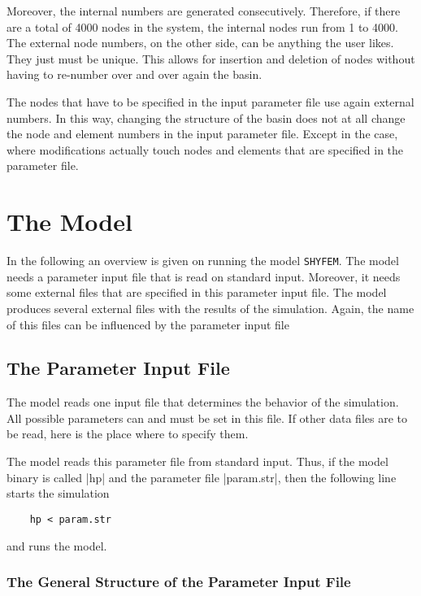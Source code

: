 \documentclass{report}
\newcommand{\shy}{{\tt SHYFEM}}
\begin{document}
Moreover, the internal numbers are generated consecutively.
Therefore, if there are a total of 4000 nodes in the system, the internal
nodes run from 1 to 4000. The external node numbers,
on the other side, can be anything the user likes. They just must be
unique. This allows for insertion and deletion of nodes without
having to re-number over and over again the basin.

The nodes that have to be specified in the input parameter file
use again external numbers. In this way, changing the structure of
the basin does not at all change the node and element numbers in the
input parameter file. Except in the case, where modifications
actually touch nodes and elements that are specified in the 
parameter file.



\chapter{The Model}

In the following an overview is given on running the model
\shy{}. The model needs a parameter input file that is read 
on standard input. Moreover, it needs some external files that
are specified in this parameter input file. The model produces
several external files with the results of the simulation. Again,
the name of this files can be influenced by the parameter input file


\section{The Parameter Input File}

The model reads one input file that determines the behavior of the
simulation. All possible parameters can and must be set in this file.
If other data files are to be read, here is the place where to specify
them.

The model reads this parameter file from standard input. Thus, if
the model binary is called |hp| and the parameter file |param.str|, 
then the following line starts the simulation
\begin{verbatim}
	hp < param.str
\end{verbatim}
and runs the model.

\subsection{The General Structure of the Parameter Input File}
\end{document}
